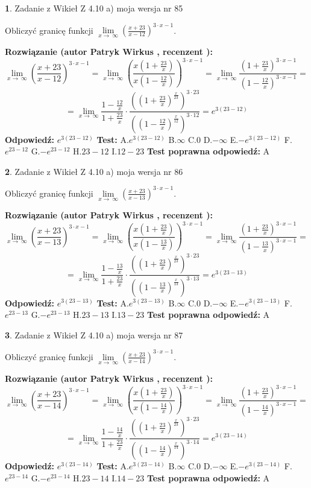 \documentclass[12pt, a4paper]{article}
\theoremstyle{definition} %
\newtheorem{zad}{}
\newcommand{\zadStart}[1]{\begin{zad}#1\newline}
\newcommand{\zadStop}{\end{zad}}
\newcommand{\rozwStart}[2]{\noindent \textbf{Rozwiązanie (autor #1 , recenzent #2): }\newline}
\newcommand{\rozwStop}{\newline}
\newcommand{\odpStart}{\noindent \textbf{Odpowiedź:}\newline}
\newcommand{\odpStop}{\newline}
\newcommand{\testStart}{\noindent \textbf{Test:}\newline}
\newcommand{\testStop}{\newline}
\newcommand{\kluczStart}{\noindent \textbf{Test poprawna odpowiedź:}\newline}
\newcommand{\kluczStop}{\newline}
\begin{document}
\zadStart{Zadanie z Wikieł Z 4.10 a) moja wersja nr 85}


Obliczyć granicę funkcji  $\lim\limits_{x\to\ \infty}(\frac{x+23}{x-12})^{3\cdot x-1}$.
\zadStop
\rozwStart{Patryk Wirkus}{}
$$\lim\limits_{x\to\ \infty}(\frac{x+23}{x-12})^{3\cdot x-1} = \lim\limits_{x\to\ \infty}(\frac{x(1+\frac{23}{x})}{x(1-\frac{12}{x})})^{3\cdot x-1}=\lim\limits_{x\to\ \infty}\frac{(1+\frac{23}{x})^{3\cdot x-1}}{(1-\frac{12}{x})^{3\cdot x-1}}=$$
$$=\lim\limits_{x\to\ \infty}\frac{1-\frac{12}{x}}{1+\frac{23}{x}}\cdot\frac{((1+\frac{23}{x})^{\frac{x}{23}})^{3\cdot23}}{((1-\frac{12}{x})^{\frac{x}{12}})^{3\cdot12}}=e^{3(23-12)}$$
\rozwStop
\odpStart
$e^{3(23-12)}$
\odpStop
\testStart
A.$e^{3(23-12)}$ B.$\infty$ C.$0$ D.$-\infty$ E.$-e^{3(23-12)}$
F.$e^{23-12}$ G.$-e^{23-12}$
H.$23-12$
I.$12-23$
\testStop
\kluczStart
A
\kluczStop



\zadStart{Zadanie z Wikieł Z 4.10 a) moja wersja nr 86}


Obliczyć granicę funkcji  $\lim\limits_{x\to\ \infty}(\frac{x+23}{x-13})^{3\cdot x-1}$.
\zadStop
\rozwStart{Patryk Wirkus}{}
$$\lim\limits_{x\to\ \infty}(\frac{x+23}{x-13})^{3\cdot x-1} = \lim\limits_{x\to\ \infty}(\frac{x(1+\frac{23}{x})}{x(1-\frac{13}{x})})^{3\cdot x-1}=\lim\limits_{x\to\ \infty}\frac{(1+\frac{23}{x})^{3\cdot x-1}}{(1-\frac{13}{x})^{3\cdot x-1}}=$$
$$=\lim\limits_{x\to\ \infty}\frac{1-\frac{13}{x}}{1+\frac{23}{x}}\cdot\frac{((1+\frac{23}{x})^{\frac{x}{23}})^{3\cdot23}}{((1-\frac{13}{x})^{\frac{x}{13}})^{3\cdot13}}=e^{3(23-13)}$$
\rozwStop
\odpStart
$e^{3(23-13)}$
\odpStop
\testStart
A.$e^{3(23-13)}$ B.$\infty$ C.$0$ D.$-\infty$ E.$-e^{3(23-13)}$
F.$e^{23-13}$ G.$-e^{23-13}$
H.$23-13$
I.$13-23$
\testStop
\kluczStart
A
\kluczStop



\zadStart{Zadanie z Wikieł Z 4.10 a) moja wersja nr 87}


Obliczyć granicę funkcji  $\lim\limits_{x\to\ \infty}(\frac{x+23}{x-14})^{3\cdot x-1}$.
\zadStop
\rozwStart{Patryk Wirkus}{}
$$\lim\limits_{x\to\ \infty}(\frac{x+23}{x-14})^{3\cdot x-1} = \lim\limits_{x\to\ \infty}(\frac{x(1+\frac{23}{x})}{x(1-\frac{14}{x})})^{3\cdot x-1}=\lim\limits_{x\to\ \infty}\frac{(1+\frac{23}{x})^{3\cdot x-1}}{(1-\frac{14}{x})^{3\cdot x-1}}=$$
$$=\lim\limits_{x\to\ \infty}\frac{1-\frac{14}{x}}{1+\frac{23}{x}}\cdot\frac{((1+\frac{23}{x})^{\frac{x}{23}})^{3\cdot23}}{((1-\frac{14}{x})^{\frac{x}{14}})^{3\cdot14}}=e^{3(23-14)}$$
\rozwStop
\odpStart
$e^{3(23-14)}$
\odpStop
\testStart
A.$e^{3(23-14)}$ B.$\infty$ C.$0$ D.$-\infty$ E.$-e^{3(23-14)}$
F.$e^{23-14}$ G.$-e^{23-14}$
H.$23-14$
I.$14-23$
\testStop
\kluczStart
A
\kluczStop
\end{document}
